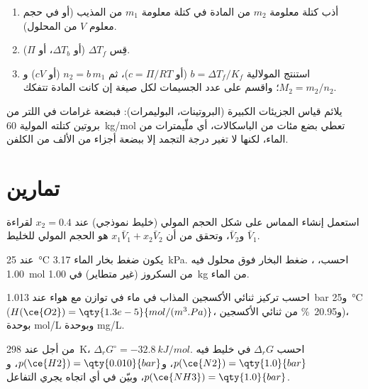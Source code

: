 \begin{method}\label{met:b2:chemical-potential:molar-mass}
\begin{enumerate}
  \item أذب كتلة معلومة $m_2$ من المادة في كتلة معلومة $m_1$
        من المذيب (أو في حجم معلوم $V$ من المحلول).
  \item قِس $\Delta T_f$ (أو $\Delta T_b$، أو $\Pi$).
  \item استنتج المولالية $b = \Delta T_f/K_f$ (أو $c = \Pi/RT$)، ثم $n_2 =
        b\,m_1$ (أو $cV$) و$M_2 = m_2/n_2$؛ واقسم على عدد
        الجسيمات لكل صيغة إن كانت المادة تتفكك.
\end{enumerate}
يلائم قياس  الجزيئات الكبيرة (البروتينات، البوليمرات): فبضعة
غرامات في اللتر من بروتين كتلته المولية \qty{60}{kg/mol} تعطي بضع مئات من
الباسكالات، أي ملّيمترات من الماء، لكنها لا تغير درجة التجمد إلا ببضعة أجزاء
من الألف من الكلفن.
\end{method}

\section{تمارين}

\begin{exercise}[$\star$]\label{exo:b2:chemical-potential:1}
استعمل إنشاء المماس على شكل الحجم المولي (خليط نموذجي)
عند $x_2 = 0.4$ لقراءة $\bar V_1$ و$\bar V_2$، وتحقق من أن
$x_1\bar V_1 + x_2\bar V_2$ هو الحجم المولي للخليط.
\end{exercise}

\begin{exercise}[$\star$]\label{exo:b2:chemical-potential:2}
عند \qty{25}{\celsius} يكون ضغط بخار الماء \qty{3.17}{kPa}.
احسب، ، ضغط البخار فوق محلول فيه
\qty{1.00}{mol} من السكروز (غير متطاير) في \qty{1.00}{kg} من الماء.
\end{exercise}

\begin{exercise}[$\star$]\label{exo:b2:chemical-potential:3}
احسب تركيز ثنائي الأكسجين المذاب في ماء في توازن مع
هواء عند \qty{1.013}{bar} و\qty{25}{\celsius} ($H(\ce{O2}) =
\qty{1.3e-5}{mol/(m^3.Pa)}$، و\qty{20.95}{\percent} من ثنائي الأكسجين)، بوحدة
\unit{mol/L} وبوحدة \unit{mg/L}.
\end{exercise}

\begin{exercise}[$\star$]\label{exo:b2:chemical-potential:4}
من أجل  عند \qty{298}{K}، $\Delta_r G^\circ =
\qty{-32.8}{kJ/mol}$. احسب $\Delta_r G$ في خليط فيه
$p(\ce{N2}) = \qty{1.0}{bar}$، و$p(\ce{H2}) = \qty{0.010}{bar}$،
و$p(\ce{NH3}) = \qty{1.0}{bar}$، وبيّن في أي اتجاه يجري التفاعل.
\end{exercise}

